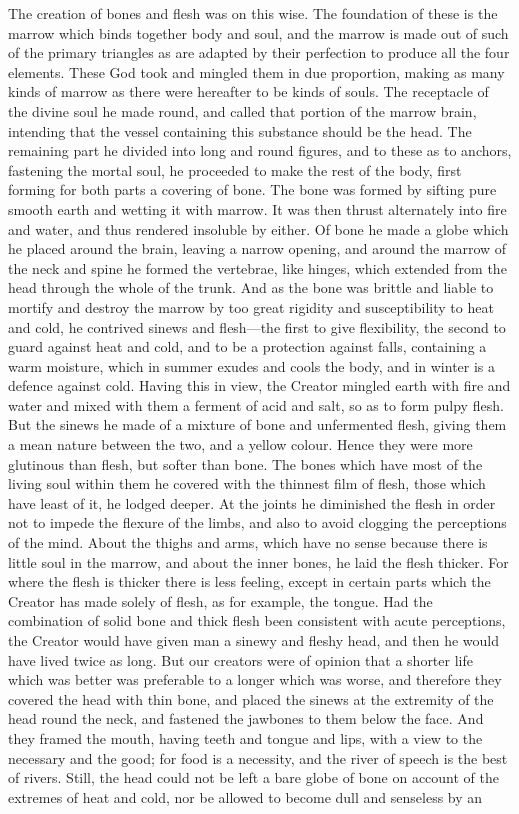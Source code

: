 \documentclass[11pt,letter]{article}
\begin{document}
\par  The creation of bones and flesh was on this wise. The foundation of these is the marrow which binds together body and soul, and the marrow is made out of such of the primary triangles as are adapted by their perfection to produce all the four elements. These God took and mingled them in due proportion, making as many kinds of marrow as there were hereafter to be kinds of souls. The receptacle of the divine soul he made round, and called that portion of the marrow brain, intending that the vessel containing this substance should be the head. The remaining part he divided into long and round figures, and to these as to anchors, fastening the mortal soul, he proceeded to make the rest of the body, first forming for both parts a covering of bone. The bone was formed by sifting pure smooth earth and wetting it with marrow. It was then thrust alternately into fire and water, and thus rendered insoluble by either. Of bone he made a globe which he placed around the brain, leaving a narrow opening, and around the marrow of the neck and spine he formed the vertebrae, like hinges, which extended from the head through the whole of the trunk. And as the bone was brittle and liable to mortify and destroy the marrow by too great rigidity and susceptibility to heat and cold, he contrived sinews and flesh—the first to give flexibility, the second to guard against heat and cold, and to be a protection against falls, containing a warm moisture, which in summer exudes and cools the body, and in winter is a defence against cold. Having this in view, the Creator mingled earth with fire and water and mixed with them a ferment of acid and salt, so as to form pulpy flesh. But the sinews he made of a mixture of bone and unfermented flesh, giving them a mean nature between the two, and a yellow colour. Hence they were more glutinous than flesh, but softer than bone. The bones which have most of the living soul within them he covered with the thinnest film of flesh, those which have least of it, he lodged deeper. At the joints he diminished the flesh in order not to impede the flexure of the limbs, and also to avoid clogging the perceptions of the mind. About the thighs and arms, which have no sense because there is little soul in the marrow, and about the inner bones, he laid the flesh thicker. For where the flesh is thicker there is less feeling, except in certain parts which the Creator has made solely of flesh, as for example, the tongue. Had the combination of solid bone and thick flesh been consistent with acute perceptions, the Creator would have given man a sinewy and fleshy head, and then he would have lived twice as long. But our creators were of opinion that a shorter life which was better was preferable to a longer which was worse, and therefore they covered the head with thin bone, and placed the sinews at the extremity of the head round the neck, and fastened the jawbones to them below the face. And they framed the mouth, having teeth and tongue and lips, with a view to the necessary and the good; for food is a necessity, and the river of speech is the best of rivers. Still, the head could not be left a bare globe of bone on account of the extremes of heat and cold, nor be allowed to become dull and senseless by an 
\end{document}
